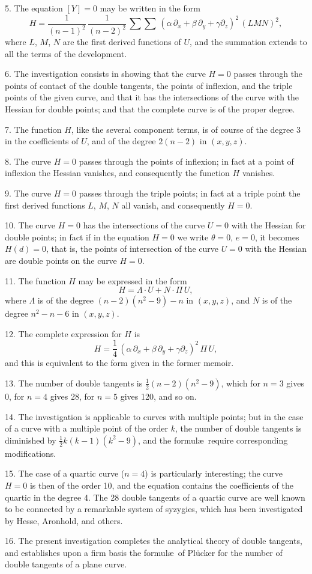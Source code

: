 \documentclass[11pt,a4paper]{article}
\theoremstyle{plain}
\theoremstyle{definition}
\begin{document}
5. The equation $[Y]=0$ may be written in the form
\[
H = \frac{1}{(n-1)^2}\,\frac{1}{(n-2)^2}\,\sum\sum\,(\alpha\,\partial_x + \beta\,\partial_y + \gamma\partial_z)^2\, (LMN)^2,
\]
where $L$, $M$, $N$ are the first derived functions of $U$, and the summation extends to all the terms of the development.

6. The investigation consists in showing that the curve $H=0$ passes through the points of contact of the double tangents, the points of inflexion, and the triple points of the given curve, and that it has the intersections of the curve with the Hessian for double points; and that the complete curve is of the proper degree.

7. The function $H$, like the several component terms, is of course of the degree 3 in the coefficients of $U$, and of the degree $2(n-2)$ in $(x, y, z)$.

8. The curve $H=0$ passes through the points of inflexion; in fact at a point of inflexion the Hessian vanishes, and consequently the function $H$ vanishes.

9. The curve $H=0$ passes through the triple points; in fact at a triple point the first derived functions $L$, $M$, $N$ all vanish, and consequently $H=0$.

10. The curve $H=0$ has the intersections of the curve $U=0$ with the Hessian for double points; in fact if in the equation $H=0$ we write $\theta=0$, $e=0$, it becomes $H(d)=0$, that is, the points of intersection of the curve $U=0$ with the Hessian are double points on the curve $H=0$.

11. The function $H$ may be expressed in the form
\[
H = \Lambda \cdot U + N \cdot \Pi\,U,
\]
where $\Lambda$ is of the degree $(n-2)(n^2-9)-n$ in $(x, y, z)$, and $N$ is of the degree $n^2-n-6$ in $(x, y, z)$.

12. The complete expression for $H$ is
\[
H = \frac{1}{4}\,(\alpha\,\partial_x + \beta\,\partial_y + \gamma\partial_z)^2\, \Pi\,U,
\]
and this is equivalent to the form given in the former memoir.

13. The number of double tangents is $\frac{1}{2}(n-2)(n^2-9)$, which for $n=3$ gives 0, for $n=4$ gives 28, for $n=5$ gives 120, and so on.

14. The investigation is applicable to curves with multiple points; but in the case of a curve with a multiple point of the order $k$, the number of double tangents is diminished by $\frac{1}{2}k(k-1)(k^2-9)$, and the formul\ae\ require corresponding modifications.

15. The case of a quartic curve ($n=4$) is particularly interesting; the curve $H=0$ is then of the order 10, and the equation contains the coefficients of the quartic in the degree 4. The 28 double tangents of a quartic curve are well known to be connected by a remarkable system of syzygies, which has been investigated by Hesse, Aronhold, and others.

16. The present investigation completes the analytical theory of double tangents, and establishes upon a firm basis the formul\ae\ of Pl\"{u}cker for the number of double tangents of a plane curve.
\end{document}
